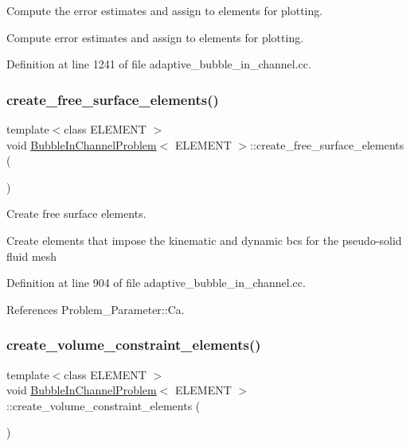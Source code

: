 Compute the error estimates and assign to elements for plotting. 

Compute error estimates and assign to elements for plotting. 

Definition at line 1241 of file adaptive\+\_\+bubble\+\_\+in\+\_\+channel.\+cc.

\mbox{\label{classBubbleInChannelProblem_a9a5a34516352db3153baa52ccb204b62}} 
\subsubsection{\texorpdfstring{create\+\_\+free\+\_\+surface\+\_\+elements()}{create\_free\_surface\_elements()}}
{\footnotesize\ttfamily template$<$class E\+L\+E\+M\+E\+NT $>$ \\
void \hyperlink{classBubbleInChannelProblem}{Bubble\+In\+Channel\+Problem}$<$ E\+L\+E\+M\+E\+NT $>$\+::create\+\_\+free\+\_\+surface\+\_\+elements (\begin{DoxyParamCaption}{ }\end{DoxyParamCaption})\hspace{0.3cm}{\ttfamily [private]}}



Create free surface elements. 

Create elements that impose the kinematic and dynamic bcs for the pseudo-\/solid fluid mesh 

Definition at line 904 of file adaptive\+\_\+bubble\+\_\+in\+\_\+channel.\+cc.



References Problem\+\_\+\+Parameter\+::\+Ca.

\mbox{\label{classBubbleInChannelProblem_ae1ab79ef810211e337127878876c0fa6}} 
\subsubsection{\texorpdfstring{create\+\_\+volume\+\_\+constraint\+\_\+elements()}{create\_volume\_constraint\_elements()}}
{\footnotesize\ttfamily template$<$class E\+L\+E\+M\+E\+NT $>$ \\
void \hyperlink{classBubbleInChannelProblem}{Bubble\+In\+Channel\+Problem}$<$ E\+L\+E\+M\+E\+NT $>$\+::create\+\_\+volume\+\_\+constraint\+\_\+elements (\begin{DoxyParamCaption}{ }\end{DoxyParamCaption})\hspace{0.3cm}{\ttfamily [private]}}



